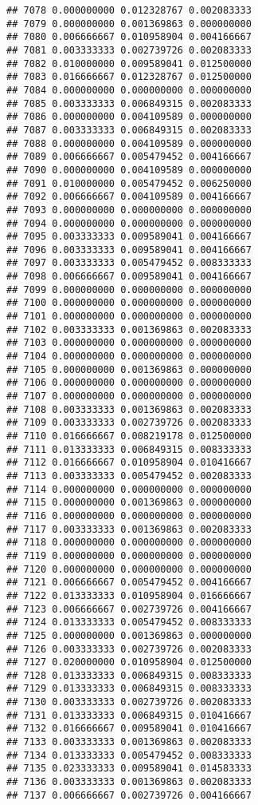 \documentclass[
]{article}
\begin{document}
\begin{verbatim}
## 7078 0.000000000 0.012328767 0.002083333
## 7079 0.000000000 0.001369863 0.000000000
## 7080 0.006666667 0.010958904 0.004166667
## 7081 0.003333333 0.002739726 0.002083333
## 7082 0.010000000 0.009589041 0.012500000
## 7083 0.016666667 0.012328767 0.012500000
## 7084 0.000000000 0.000000000 0.000000000
## 7085 0.003333333 0.006849315 0.002083333
## 7086 0.000000000 0.004109589 0.000000000
## 7087 0.003333333 0.006849315 0.002083333
## 7088 0.000000000 0.004109589 0.000000000
## 7089 0.006666667 0.005479452 0.004166667
## 7090 0.000000000 0.004109589 0.000000000
## 7091 0.010000000 0.005479452 0.006250000
## 7092 0.006666667 0.004109589 0.004166667
## 7093 0.000000000 0.000000000 0.000000000
## 7094 0.000000000 0.000000000 0.000000000
## 7095 0.003333333 0.009589041 0.004166667
## 7096 0.003333333 0.009589041 0.004166667
## 7097 0.003333333 0.005479452 0.008333333
## 7098 0.006666667 0.009589041 0.004166667
## 7099 0.000000000 0.000000000 0.000000000
## 7100 0.000000000 0.000000000 0.000000000
## 7101 0.000000000 0.000000000 0.000000000
## 7102 0.003333333 0.001369863 0.002083333
## 7103 0.000000000 0.000000000 0.000000000
## 7104 0.000000000 0.000000000 0.000000000
## 7105 0.000000000 0.001369863 0.000000000
## 7106 0.000000000 0.000000000 0.000000000
## 7107 0.000000000 0.000000000 0.000000000
## 7108 0.003333333 0.001369863 0.002083333
## 7109 0.003333333 0.002739726 0.002083333
## 7110 0.016666667 0.008219178 0.012500000
## 7111 0.013333333 0.006849315 0.008333333
## 7112 0.016666667 0.010958904 0.010416667
## 7113 0.003333333 0.005479452 0.002083333
## 7114 0.000000000 0.000000000 0.000000000
## 7115 0.000000000 0.001369863 0.000000000
## 7116 0.000000000 0.000000000 0.000000000
## 7117 0.003333333 0.001369863 0.002083333
## 7118 0.000000000 0.000000000 0.000000000
## 7119 0.000000000 0.000000000 0.000000000
## 7120 0.000000000 0.000000000 0.000000000
## 7121 0.006666667 0.005479452 0.004166667
## 7122 0.013333333 0.010958904 0.016666667
## 7123 0.006666667 0.002739726 0.004166667
## 7124 0.013333333 0.005479452 0.008333333
## 7125 0.000000000 0.001369863 0.000000000
## 7126 0.003333333 0.002739726 0.002083333
## 7127 0.020000000 0.010958904 0.012500000
## 7128 0.013333333 0.006849315 0.008333333
## 7129 0.013333333 0.006849315 0.008333333
## 7130 0.003333333 0.002739726 0.002083333
## 7131 0.013333333 0.006849315 0.010416667
## 7132 0.016666667 0.009589041 0.010416667
## 7133 0.003333333 0.001369863 0.002083333
## 7134 0.013333333 0.005479452 0.008333333
## 7135 0.023333333 0.009589041 0.014583333
## 7136 0.003333333 0.001369863 0.002083333
## 7137 0.006666667 0.002739726 0.004166667

\end{verbatim}
\end{document}
